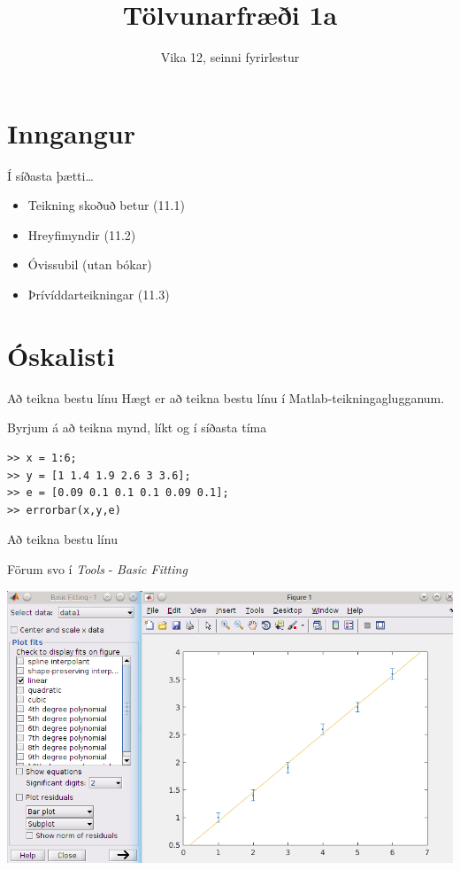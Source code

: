 \documentclass[handout]{beamer}
\title{Tölvunarfræði 1a}
\subtitle{Vika 12, seinni fyrirlestur}
\begin{document}
\begin{frame}
\titlepage
\end{frame}

\section{Inngangur}

\begin{frame}{Í síðasta þætti\ldots}
\begin{itemize}
 \item Teikning skoðuð betur (11.1)
 \item Hreyfimyndir (11.2)
 \item Óvissubil (utan bókar)
 \item Þrívíddarteikningar (11.3)
\end{itemize}
\end{frame}

\section{Óskalisti}

\begin{frame}[fragile]{Að teikna bestu línu}
Hægt er að teikna bestu línu í Matlab-teikningaglugganum.

Byrjum á að teikna mynd, líkt og í síðasta tíma
\begin{verbatim}
>> x = 1:6;
>> y = [1 1.4 1.9 2.6 3 3.6];
>> e = [0.09 0.1 0.1 0.1 0.09 0.1];
>> errorbar(x,y,e)
\end{verbatim}
\end{frame}

\begin{frame}{Að teikna bestu línu}

\small Förum svo í \emph{Tools} - \emph{Basic Fitting}

\begin{center}
\includegraphics[width=\textwidth]{Pics/errorbar-line}
\end{center}
\end{frame}
\end{document}
